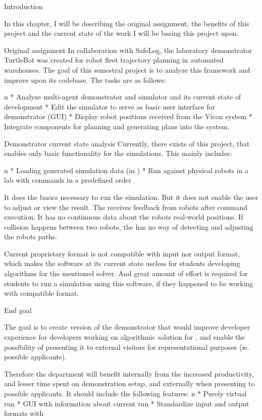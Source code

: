 \chap Introduction

In this chapter, I will be describing the original assignment, the benefits of this project and the current state of the work I will be basing this project upon.

\sec Original assignment
In collaboration with SafeLog, the laboratory demonstrator TurtleBot was created for robot fleet trajectory planning in automated warehouses. The goal of this semestral project is to analyze this framework and improve upon its codebase. The tasks are as follows:

\begitems \style n
    * Analyze multi-agent demonstrator and simulator {\mapfIR} and its current state of development 
    * Edit the simulator to serve as basic user interface for demonstrator (GUI)
    * Display robot positions received from the Vicon system
    * Integrate components for planning and generating plans into the system.
\enditems

\sec Demonstrator current state analysis
Currently, there exists {\oldRepo} of this project, that enables only basic functionality for the simulations. This mainly includes:

\begitems \style n
    * Loading generated simulation data (in {\oldFormat})
    * Run against physical robots in a lab with commands in a predefined order
\enditems

It does the basics necessary to run the simulation. But it does not enable the user to adjust or view the result. The {\oldRepo} receives feedback from robots after command execution. It has no continuous data about the robots real-world positions. If collision happens between two robots, the {\oldRepo} has no way of detecting and adjusting the robots paths.

Current proprietary format is not compatible with {\mapfIR} input nor output format, which makes the software at its current state useless for students developing algorithms for the mentioned solver. And great amount of effort is required for students to run a simulation using this software, if they happened to be working with compatible format.

\sec End goal

The goal is to create version of the demonstrator that would improve developer experience for developers working on algorithmic solution for {\mapfIR}, and enable the possibility of presenting it to external visitors for representational purposes (ie. possible applicants).

Therefore the department will benefit internally from the increased productivity, and lesser time spent on demonstration setup, and externally when presenting to possible applicants.
It should include the following features:
\begitems \style n
    * Purely virtual run
    * GUI with information about current run
    * Standardize input and output formats with \mapfIR
\enditems